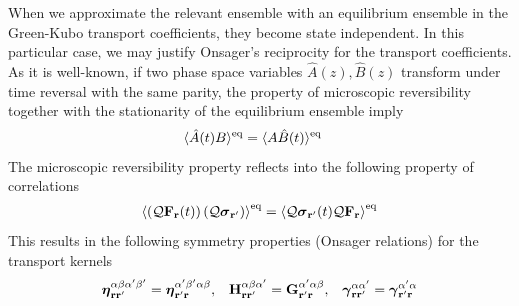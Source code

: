 \documentclass[b5paper,openright,10pt]{book}
\begin{document}
When we approximate the relevant ensemble with an equilibrium ensemble
in   the  Green-Kubo   transport  coefficients,   they  become   state
independent.  In  this  particular  case,  we  may  justify  Onsager's
reciprocity for the  transport coefficients.  As it  is well-known, if
two phase space variables $\hat{A}(z),\hat{B}(z)$ transform under time
reversal   with  the   same  parity,   the  property   of  microscopic
reversibility  together  with  the  stationarity  of  the  equilibrium
ensemble imply
\begin{align}
  \langle \hat{A}(t)B\rangle^{\rm eq}&=  \langle A\hat{B}(t)\rangle^{\rm eq}
\end{align}
The microscopic reversibility
property reflects into the following  property of correlations
\begin{align}
\left\langle \left({\cal Q}{\bf F}_{\bf r}(t)\right)\left({\cal Q} \boldsymbol{\sigma}_{{\bf r}'}\right)\right\rangle^{\rm eq}=
  \left\langle {\cal Q} \boldsymbol{\sigma}_{{\bf r}'}(t){\cal Q}{\bf F}_{{\bf r}}\right\rangle^{\rm eq}
\end{align}
This results in the  following symmetry properties (Onsager relations)
for the transport kernels
\begin{align}
  \boldsymbol{\eta}^{\alpha\beta\alpha'\beta'}_{{\bf  r}{\bf r}'} =
  \boldsymbol{\eta}^{\alpha'\beta'\alpha\beta}_{{\bf r}'{\bf  r}},&&
{\bf H}^{\alpha\beta\alpha'}_{{\bf r}{\bf r}'}={\bf G}^{\alpha'\alpha\beta}_{{\bf r}'{\bf  r}},&&
\boldsymbol{\gamma}^{\alpha\alpha'}_{{\bf  r}{\bf r}'}=\boldsymbol{\gamma}^{\alpha'\alpha}_{{\bf r}'{\bf  r}}
\label{GKsymmetries}
\end{align}
\end{document}
